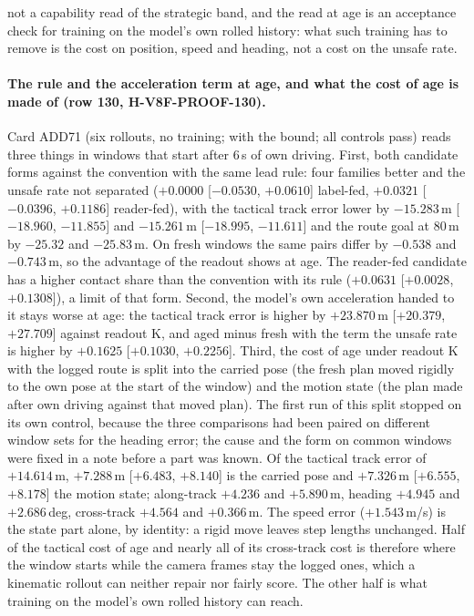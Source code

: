 not a capability read of the strategic band, and the read at age is an acceptance check for training on the model's own rolled history: what such training has to remove is the cost on position, speed and heading, not a cost on the unsafe rate.

\paragraph{The rule and the acceleration term at age, and what the cost of age is made of (row 130, H-V8F-PROOF-130).} Card ADD71 (six rollouts, no training;  with the bound; all controls pass) reads three things in windows that start after 6\,s of own driving. First, both candidate forms against the convention with the same lead rule: four families better and the unsafe rate not separated ($+0.0000$ [$-0.0530$, $+0.0610$] label-fed, $+0.0321$ [$-0.0396$, $+0.1186$] reader-fed), with the tactical track error lower by $-15.283$\,m [$-18.960$, $-11.855$] and $-15.261$\,m [$-18.995$, $-11.611$] and the route goal at 80\,m by $-25.32$ and $-25.83$\,m. On fresh windows the same pairs differ by $-0.538$ and $-0.743$\,m, so the advantage of the readout shows at age. The reader-fed candidate has a higher contact share than the convention with its rule ($+0.0631$ [$+0.0028$, $+0.1308$]), a limit of that form. Second, the model's own acceleration handed to it stays worse at age: the tactical track error is higher by $+23.870$\,m [$+20.379$, $+27.709$] against readout K, and aged minus fresh with the term the unsafe rate is higher by $+0.1625$ [$+0.1030$, $+0.2256$]. Third, the cost of age under readout K with the logged route is split into the carried pose (the fresh plan moved rigidly to the own pose at the start of the window) and the motion state (the plan made after own driving against that moved plan). The first run of this split stopped on its own control, because the three comparisons had been paired on different window sets for the heading error; the cause and the form on common windows were fixed in a note before a part was known. Of the tactical track error of $+14.614$\,m, $+7.288$\,m [$+6.483$, $+8.140$] is the carried pose and $+7.326$\,m [$+6.555$, $+8.178$] the motion state; along-track $+4.236$ and $+5.890$\,m, heading $+4.945$ and $+2.686$\,deg, cross-track $+4.564$ and $+0.366$\,m. The speed error ($+1.543$\,m/s) is the state part alone, by identity: a rigid move leaves step lengths unchanged. Half of the tactical cost of age and nearly all of its cross-track cost is therefore where the window starts while the camera frames stay the logged ones, which a kinematic rollout can neither repair nor fairly score. The other half is what training on the model's own rolled history can reach.

